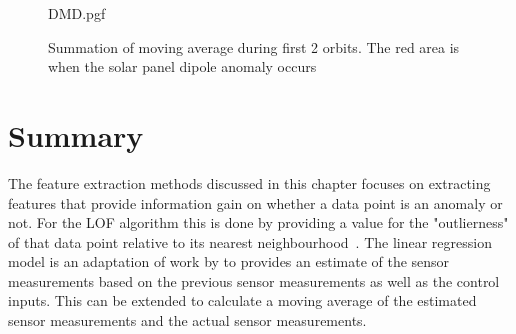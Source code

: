 \begin{figure}[!htb]
	\centering
	
	{DMD.pgf}
	
	\caption{Summation of moving average during first 2 orbits. The red area is when the solar panel dipole anomaly occurs}
	\label{fig:solarPanelDipoleDMD}
\end{figure}


\section{Summary}
The feature extraction methods discussed in this chapter focuses on extracting features that provide information gain on whether a data point is an anomaly or not. For the LOF algorithm this is done by providing a value for the "outlierness" of that data point relative to its nearest neighbourhood~\cite{breunig2000lof}. The linear regression model is an adaptation of work by \cite{DeSilva2020} to provides an estimate of the sensor measurements based on the previous sensor measurements as well as the control inputs. This can be extended to calculate a moving average of the estimated sensor measurements and the actual sensor measurements.